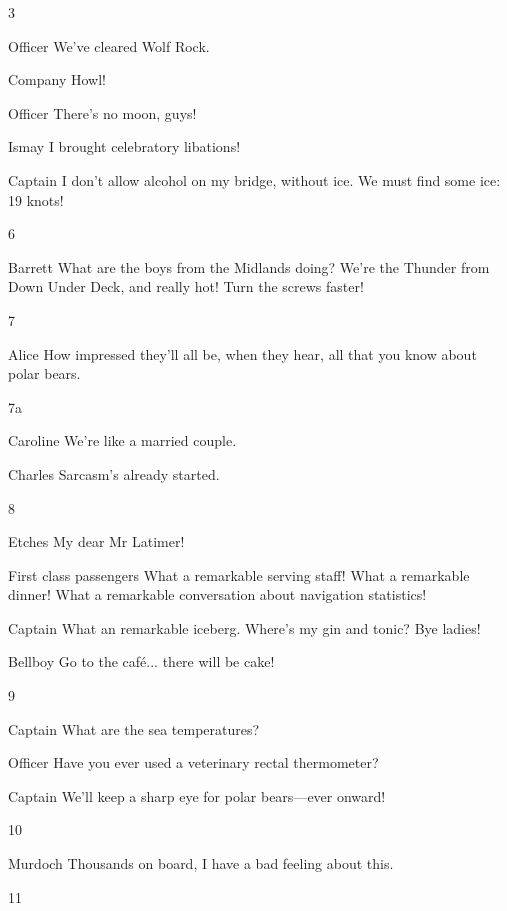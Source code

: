 \documentclass{screenplay}
\newcommand{\alice}[1]{\begin{dialogue}{Alice}#1\end{dialogue}}
\newcommand{\barrett}[1]{\begin{dialogue}{Barrett}#1\end{dialogue}}
\newcommand{\bellboy}[1]{\begin{dialogue}{Bellboy}#1\end{dialogue}}
\newcommand{\captain}[1]{\begin{dialogue}{Captain}#1\end{dialogue}}
\newcommand{\caroline}[1]{\begin{dialogue}{Caroline}#1\end{dialogue}}
\newcommand{\charles}[1]{\begin{dialogue}{Charles}#1\end{dialogue}}
\newcommand{\etches}[1]{\begin{dialogue}{Etches}#1\end{dialogue}}
\newcommand{\ismay}[1]{\begin{dialogue}{Ismay}#1\end{dialogue}}
\newcommand{\murdoch}[1]{\begin{dialogue}{Murdoch}#1\end{dialogue}}
\newcommand{\officer}[1]{\begin{dialogue}{Officer}#1\end{dialogue}}
\newcommand{\first}[1]{\begin{dialogue}{First class passengers}#1\end{dialogue}}
\newcommand{\company}[1]{\begin{dialogue}{Company}#1\end{dialogue}}
\begin{document}

3

\officer{
    We've cleared Wolf Rock.
}

\company{
    Howl!
}

\officer{
    There's no moon, guys!
}

\ismay{
    I brought celebratory libations!
}

\captain{
    I don't allow alcohol on my bridge, without ice.
    We must find some ice: 19 knots!
}


6

\barrett{
    What are the boys from the Midlands doing?
    We're the Thunder from Down Under Deck, and really hot!
    Turn the screws faster!
}


7

\alice{
    How impressed they'll all be,
    when they hear,
    all that you know about polar bears.
}

7a

\caroline{
    We're like a married couple.
}

\charles{
    Sarcasm's already started.
}


8

\etches{
    My dear Mr Latimer!
}

\first{
    What a remarkable serving staff!
    What a remarkable dinner!
    What a remarkable conversation about navigation statistics!
}

\captain{
    What an remarkable iceberg.  Where's my gin and tonic?  Bye ladies!
}

\bellboy{
    Go to the caf\'e... there will be cake!
}


9

\captain{
    What are the sea temperatures?
}

\officer{
    Have you ever used a veterinary rectal thermometer?
}

\captain{
    We'll keep a sharp eye for polar bears---ever onward!
}

10

\murdoch{
    Thousands on board,
    I have a bad feeling about this.
}


11
\end{document}
